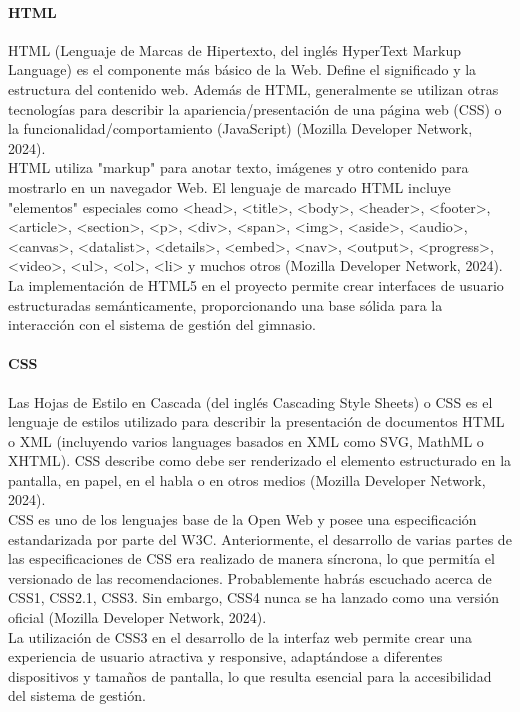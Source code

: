 \documentclass[12pt, letterpaper]{article}
\begin{document}
\paragraph{\textbf{HTML}}
HTML (Lenguaje de Marcas de Hipertexto, del inglés HyperText Markup Language) es el componente más básico de la Web. Define el significado y la estructura del contenido web. Además de HTML, generalmente se utilizan otras tecnologías para describir la apariencia/presentación de una página web (CSS) o la funcionalidad/comportamiento (JavaScript) (Mozilla Developer Network, 2024).\\
HTML utiliza "markup" para anotar texto, imágenes y otro contenido para mostrarlo en un navegador Web. El lenguaje de marcado HTML incluye "elementos" especiales como <head>, <title>, <body>, <header>, <footer>, <article>, <section>, <p>, <div>, <span>, <img>, <aside>, <audio>, <canvas>, <datalist>, <details>, <embed>, <nav>, <output>, <progress>, <video>, <ul>, <ol>, <li> y muchos otros (Mozilla Developer Network, 2024).\\
La implementación de HTML5 en el proyecto permite crear interfaces de usuario estructuradas semánticamente, proporcionando una base sólida para la interacción con el sistema de gestión del gimnasio.\\
\paragraph{\textbf{CSS}}
Las Hojas de Estilo en Cascada (del inglés Cascading Style Sheets) o CSS es el lenguaje de estilos utilizado para describir la presentación de documentos HTML o XML (incluyendo varios languages basados en XML como SVG, MathML o XHTML). CSS describe como debe ser renderizado el elemento estructurado en la pantalla, en papel, en el habla o en otros medios (Mozilla Developer Network, 2024).\\
CSS es uno de los lenguajes base de la Open Web y posee una especificación estandarizada por parte del W3C. Anteriormente, el desarrollo de varias partes de las especificaciones de CSS era realizado de manera síncrona, lo que permitía el versionado de las recomendaciones. Probablemente habrás escuchado acerca de CSS1, CSS2.1, CSS3. Sin embargo, CSS4 nunca se ha lanzado como una versión oficial (Mozilla Developer Network, 2024).\\
La utilización de CSS3 en el desarrollo de la interfaz web permite crear una experiencia de usuario atractiva y responsive, adaptándose a diferentes dispositivos y tamaños de pantalla, lo que resulta esencial para la accesibilidad del sistema de gestión.\\
\end{document}
